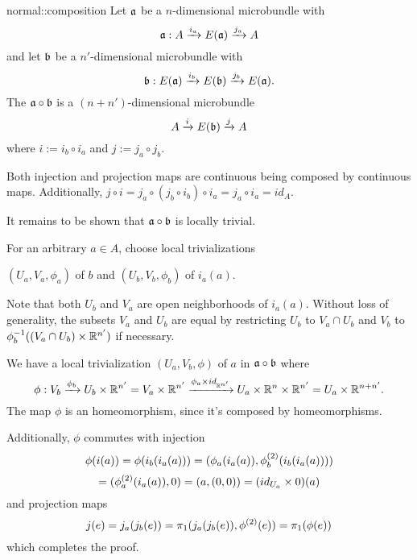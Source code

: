 \begin{mydefinition}{normal::composition}
    Let $\ba$ be a $n$-dimensional microbundle with
    \[ \bundledef{\ba}{A}{E(\ba)}{i_a}{j_a} \]
    and let $\bb$ be a $n'$-dimensional microbundle with
    \[ \bundledef{\bb}{E(\ba)}{E(\bb)}{i_b}{j_b}. \]
    The  $\ba \circ \bb$ is a $(n + n')$-dimensional microbundle
    \[ \bundle{A}{E(\bb)}{i}{j} \]
    where $i := i_b \circ i_a$ and $j := j_a \circ j_b$.
\end{mydefinition}

\begin{myproof}
    Both injection and projection maps are continuous being composed by continuous maps.
    Additionally, $j \circ i = j_a \circ (j_b \circ i_b) \circ i_a = j_a \circ i_a = id_A$.

    It remains to be shown that $\ba \circ \bb$ is locally trivial.

    For an arbitrary $a \in A$, choose local trivializations
    \begin{center}
        $(U_a, V_a, \phi_a)$ of $b$ and $(U_b, V_b, \phi_b)$ of $i_a(a)$.
    \end{center}
    Note that both $U_b$ and $V_a$ are open neighborhoods of $i_a(a)$.
    Without loss of generality, the subsets $V_a$ and $U_b$ are equal by
    restricting $U_b$ to $V_a \cap U_b$ and $V_b$ to $\inv{\phi_b}((V_a \cap U_b) \times \R^{n'})$ if necessary.

    We have a local trivialization $(U_a, V_b, \phi)$ of $a$ in $\ba \circ \bb$ where
    \[ 
        \phi: V_b \xto{\phi_b} U_b \times \R^{n'}
        = V_a \times \R^{n'}
        \xto{\phi_a \times id_{\R^{n'}}} U_a \times \R^{n} \times \R^{n'}
        = U_a \times \R^{n + n'}.
    \]
    The map $\phi$ is an homeomorphism, since it's composed by homeomorphisms.

    Additionally, $\phi$ commutes with injection
    \[ \phi(i(a)) = \phi(i_b(i_a(a))) = (\phi_a(i_a(a)), \snd{\phi_b}(i_b(i_a(a)))) \]
    \[ = (\snd{\phi_a}(i_a(a)), 0) = (a, (0, 0)) = (id_{U_a} \times 0)(a) \]
    and projection maps
    \[ j(e) = j_a(j_b(e)) = \pi_1(j_a(j_b(e)), \snd{\phi}(e)) = \pi_1(\phi(e)) \]
    which completes the proof.
\end{myproof}